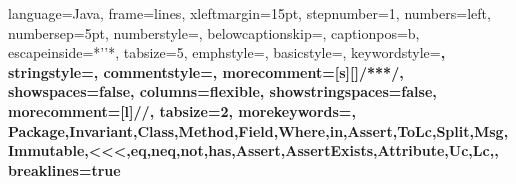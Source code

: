  {
  language=Java,
  frame=lines,
  xleftmargin=15pt, 
  stepnumber=1, 
  numbers=left, 
  numbersep=5pt,
  numberstyle=\tiny\color[gray]{0.3}, 
  belowcaptionskip=\bigskipamount,
  captionpos=b, 
  escapeinside={*'}{'*},
  tabsize=5,
  emphstyle={\bf},
  basicstyle=\scriptsize\ttfamily,
  keywordstyle=\color{black}\bfseries,
  stringstyle=\color{black},
  commentstyle=\color{black},
  morecomment=[s][\color{black}]{/**}{*/},
  showspaces=false,
  columns=flexible,
  showstringspaces=false,
  morecomment=[l]{//},
  tabsize=2,
  morekeywords={, Package,Invariant,Class,Method,Field,Where,in,Assert,ToLc,Split,Msg,Immutable,<<<,eq,neq,not,has,Assert,AssertExists,Attribute,Uc,Lc,},
  breaklines=true
}
\lstset{style=MyJavaStyle}

